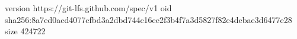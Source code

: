 version https://git-lfs.github.com/spec/v1
oid sha256:8a7ed0acd4077cfbd3a2dbd744c16ee2f3b4f7a3d5827f82e4debae3d6477e28
size 424722
